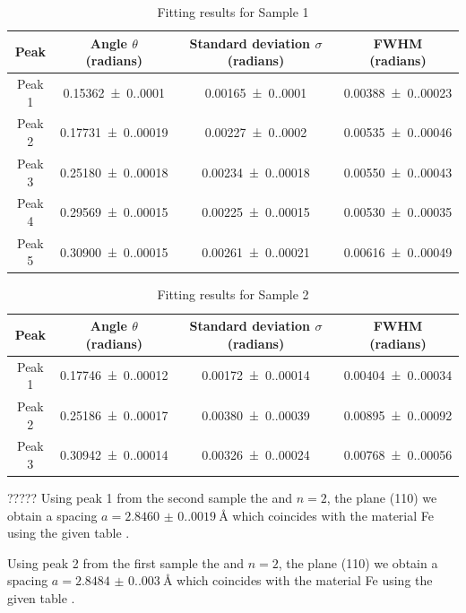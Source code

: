 \begin{table}[H]
    \centering
    \caption{Fitting results for Sample 1}
    \begin{tabular}{|c|c|c|c|}
    \hline
    Peak & Angle $\theta$ (radians) & Standard deviation $\sigma$ (radians) & FWHM (radians) \\
    \hline
    Peak 1 & \SI{0.15362(0.00010)}{} & \SI{0.00165(0.00010)}{} & \SI{0.00388(0.00023)}{} \\
    \hline
    Peak 2 & \SI{0.17731(0.00019)}{} & \SI{0.00227(0.00020)}{} & \SI{0.00535(0.00046)}{} \\
    \hline
    Peak 3 & \SI{0.25180(0.00018)}{} & \SI{0.00234(0.00018)}{} & \SI{0.00550(0.00043)}{} \\
    \hline
    Peak 4 & \SI{0.29569(0.00015)}{} & \SI{0.00225(0.00015)}{} & \SI{0.00530(0.00035)}{} \\
    \hline
    Peak 5 & \SI{0.30900(0.00015)}{} & \SI{0.00261(0.00021)}{} & \SI{0.00616(0.00049)}{} \\
    \hline
    \end{tabular}
\end{table}

\begin{table}[H]
    \centering
    \caption{Fitting results for Sample 2}
    \begin{tabular}{|c|c|c|c|}
    \hline
    Peak & Angle $\theta$ (radians) & Standard deviation $\sigma$ (radians) & FWHM (radians) \\
    \hline
    Peak 1 & \SI{0.17746(0.00012)}{} & \SI{0.00172(0.00014)}{} & \SI{0.00404(0.00034)}{} \\
    \hline
    Peak 2 & \SI{0.25186(0.00017)}{} & \SI{0.00380(0.00039)}{} & \SI{0.00895(0.00092)}{} \\
    \hline
    Peak 3 & \SI{0.30942(0.00014)}{} & \SI{0.00326(0.00024)}{} & \SI{0.00768(0.00056)}{} \\
    \hline
    \end{tabular}
\end{table}



????? Using peak 1 from the second sample the and $n=2$, the plane (110) we obtain a spacing $a=\SI{2.8460(0.0019)}{\angstrom}$ which coincides with the material Fe using the given table \cite{solidstatephysics2025}.  

Using peak 2 from the first sample the and $n=2$, the plane (110) we obtain a spacing $a=\SI{2.8484(0.0030)}{\angstrom}$ which coincides with the material Fe using the given table \cite{solidstatephysics2025}.  